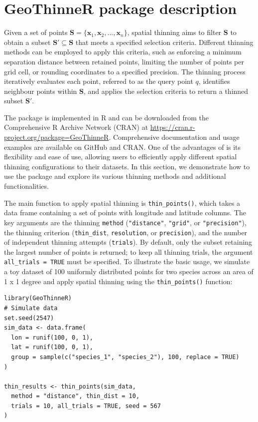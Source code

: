 \section{GeoThinneR package description}\label{packagedescription}

Given a set of points \(\mathbf{S} = \{ \mathbf{x}_1, \mathbf{x}_2, \dots, \mathbf{x}_n \}\), spatial thinning aims to filter \(\mathbf{S}\) to obtain a subset \(\mathbf{S}' \subseteq \mathbf{S}\) that meets a specified selection criteria. Different thinning methods can be employed to apply this criteria, such as enforcing a minimum separation distance between retained points, limiting the number of points per grid cell, or rounding coordinates to a specified precision. The thinning process iteratively evaluates each point, referred to as the query point \(q\), identifies neighbour points within \(\mathbf{S}\), and applies the selection criteria to return a thinned subset \(\mathbf{S}'\).

The  package is implemented in R and can be downloaded from the Comprehensive R Archive Network (CRAN) at \url{https://cran.r-project.org/package=GeoThinneR}. Comprehensive documentation and usage examples are available on GitHub and CRAN. One of the advantages of  is its flexibility and ease of use, allowing users to efficiently apply different spatial thinning configurations to their datasets. In this section, we demonstrate how to use the package and explore its various thinning methods and additional functionalities.

The main function to apply spatial thinning is \texttt{thin\_points()}, which takes a data frame containing a set of points with longitude and latitude columns. The key arguments are the thinning \texttt{method} (\texttt{"distance"}, \texttt{"grid"}, or \texttt{"precision"}), the thinning criterion (\texttt{thin\_dist}, \texttt{resolution}, or \texttt{precision}), and the number of independent thinning attempts (\texttt{trials}). By default, only the subset retaining the largest number of points is returned; to keep all thinning trials, the argument \texttt{all\_trials\ =\ TRUE} must be specified. To illustrate the basic usage, we simulate a toy dataset of 100 uniformly distributed points for two species across an area of 1 x 1 degree and apply spatial thinning using the \texttt{thin\_points()} function:

\begin{verbatim}
library(GeoThinneR)
# Simulate data
set.seed(2547)
sim_data <- data.frame(
  lon = runif(100, 0, 1),
  lat = runif(100, 0, 1),
  group = sample(c("species_1", "species_2"), 100, replace = TRUE)
)

thin_results <- thin_points(sim_data,
  method = "distance", thin_dist = 10,
  trials = 10, all_trials = TRUE, seed = 567
)
\end{verbatim}

